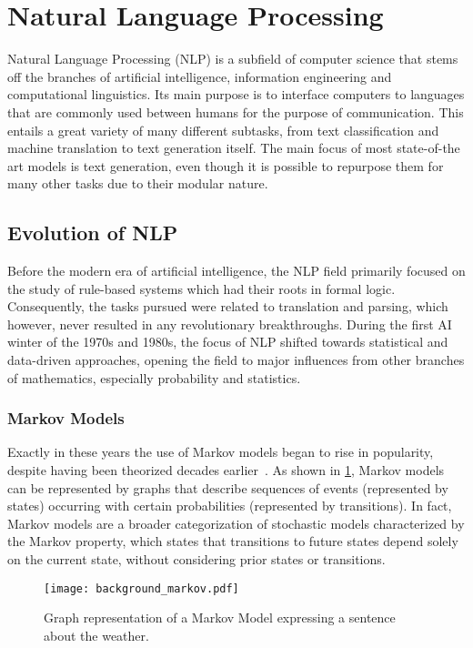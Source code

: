 \section{Natural Language Processing}

Natural Language Processing (NLP) is a subfield of computer science that stems off the branches of artificial intelligence, information engineering and computational linguistics.
Its main purpose is to interface computers to languages that are commonly used between humans for the purpose of communication.
This entails a great variety of many different subtasks, from text classification and machine translation to text generation itself.
The main focus of most state-of-the art models is text generation, even though it is possible to repurpose them for many other tasks due to their modular nature.

\subsection{Evolution of NLP}

Before the modern era of artificial intelligence, the NLP field primarily focused on the study of rule-based systems which had their roots in formal logic.
Consequently, the tasks pursued were related to translation and parsing, which however, never resulted in any revolutionary breakthroughs.
During the first AI winter of the 1970s and 1980s, the focus of NLP shifted towards statistical and data-driven approaches, opening the field to major influences from other branches of mathematics, especially probability and statistics.

\subsubsection*{Markov Models}

Exactly in these years the use of Markov models began to rise in popularity, despite having been theorized decades earlier~\cite{shannon1948}.
As shown in \cref{fig:background_markov}, Markov models can be represented by graphs that describe sequences of events (represented by states) occurring with certain probabilities (represented by transitions). 
In fact, Markov models are a broader categorization of stochastic models characterized by the Markov property, which states that transitions to future states depend solely on the current state, without considering prior states or transitions.

\begin{figure}[t!]
    \centering
    \texttt{[image: background\_markov.pdf]}
    \caption{Graph representation of a Markov Model expressing a sentence about the weather.}
    \label{fig:background_markov}
\end{figure}

